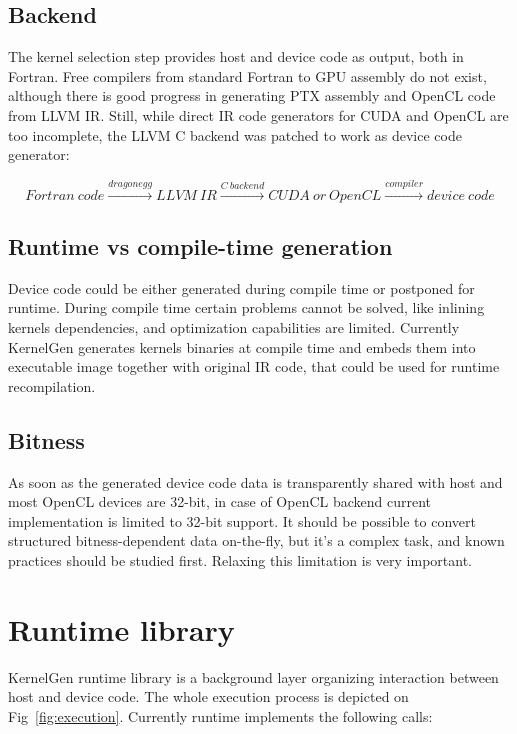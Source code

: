 \documentclass[a4,12pt]{article}
\begin{document}
\subsection{Backend}

The kernel selection step provides host and device code as output, both in Fortran. Free compilers from standard Fortran to GPU assembly do not exist, although there is good progress in generating PTX assembly and OpenCL code from LLVM IR. Still, while direct IR code generators for CUDA and OpenCL are too incomplete, the LLVM C backend was patched to work as device code generator:

$$
Fortran~code\xrightarrow{dragonegg}LLVM~IR\xrightarrow{C~backend}CUDA~or~OpenCL\xrightarrow{compiler}device~code
$$

\subsection{Runtime vs compile-time generation}

Device code could be either generated during compile time or postponed for runtime. During compile time certain problems cannot be solved, like inlining kernels dependencies, and optimization capabilities are limited. Currently KernelGen generates kernels binaries at compile time and embeds them into executable image together with original IR code, that could be used for runtime recompilation.

\subsection{Bitness}

As soon as the generated device code data is transparently shared with host and most OpenCL devices are 32-bit, in case of OpenCL backend current implementation is limited to 32-bit support. It should be possible to convert structured bitness-dependent data on-the-fly, but it's a complex task, and known practices should be studied first. Relaxing this limitation is very important.

\section{Runtime library}

KernelGen runtime library is a background layer organizing interaction between host and device code. The whole execution process is depicted on Fig~\ref{fig:execution}. Currently runtime implements the following calls:
\end{document}
